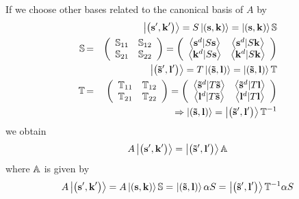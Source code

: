 If we choose other bases related to the canonical basis of $A$ by 
\begin{eqnarray}
&&\qquad \quad \left| \left( {\bf s}^{\prime }{\bf ,k}^{\prime }\right)
\right\rangle =S\left| \left( {\bf s,k}\right) \right\rangle =\left| \left( 
{\bf s,k}\right) \right\rangle {\Bbb S}  \nonumber \\
{\Bbb S\,} &{\Bbb =}&\left( 
\begin{array}{cc}
{\Bbb S}_{11} & {\Bbb S}_{12} \\ 
{\Bbb S}_{21} & {\Bbb S}_{22}%
\end{array}%
\right) =\left( 
\begin{array}{cc}
\left\langle {\bf s}^{d}|S{\bf s}\right\rangle & \left\langle {\bf s}^{d}|S%
{\bf k}\right\rangle \\ 
\left\langle {\bf k}^{d}|S{\bf s}\right\rangle & \left\langle {\bf k}^{d}|S%
{\bf k}\right\rangle%
\end{array}%
\right)  \nonumber \\
&&\qquad \quad \,\left| \left( {\bf \tilde{s}}^{\prime }{\bf ,l}^{\prime
}\right) \right\rangle =T\left| \left( {\bf \tilde{s},l}\right)
\right\rangle =\left| \left( {\bf \tilde{s},l}\right) \right\rangle {\Bbb T}
\nonumber \\
{\Bbb T}{\Bbb \,} &{\Bbb =}&\left( 
\begin{array}{cc}
{\Bbb T}_{11} & {\Bbb T}_{12} \\ 
{\Bbb T}_{21} & {\Bbb T}_{22}%
\end{array}%
\right) =\left( 
\begin{array}{cc}
\left\langle {\bf \tilde{s}}^{d}|T{\bf \tilde{s}}\right\rangle & 
\left\langle {\bf \tilde{s}}^{d}|T{\bf l}\right\rangle \\ 
\left\langle {\bf l}^{d}|T{\bf \tilde{s}}\right\rangle & \left\langle {\bf l}%
^{d}|T{\bf l}\right\rangle%
\end{array}%
\right)  \nonumber \\
&&\qquad \quad \Rightarrow \left| \left( {\bf \tilde{s},l}\right)
\right\rangle =\left| \left( {\bf \tilde{s}}^{\prime }{\bf ,l}^{\prime
}\right) \right\rangle {\Bbb T}^{-1}
\end{eqnarray}%
we obtain%
\begin{equation}
A\left| \left( {\bf s}^{\prime }{\bf ,k}^{\prime }\right) \right\rangle
=\left| \left( {\bf \tilde{s}}^{\prime }{\bf ,l}^{\prime }\right)
\right\rangle {\Bbb A}
\end{equation}%
where ${\Bbb A}$ is given by 
\begin{equation}
A\left| \left( {\bf s}^{\prime }{\bf ,k}^{\prime }\right) \right\rangle
=A\left| \left( {\bf s,k}\right) \right\rangle {\Bbb S=\,}\left| \left( {\bf 
\tilde{s},l}\right) \right\rangle {\Bbb \alpha S=\,}\left| \left( {\bf 
\tilde{s}}^{\prime }{\bf ,l}^{\prime }\right) \right\rangle {\Bbb T}^{-1}%
{\Bbb \alpha S}
\end{equation}
